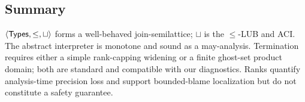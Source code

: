 \subsection{Summary}
$\langle\mathsf{Types},\le,\sqcup\rangle$ forms a well-behaved join-semilattice; $\sqcup$ is the $\le$-LUB and ACI.
The abstract interpreter is monotone and sound as a may-analysis.
Termination requires either a simple rank-capping widening or a finite ghost-set product domain; both are standard and compatible with our diagnostics.
Ranks quantify analysis-time precision loss and support bounded-blame localization but do not constitute a safety guarantee.
